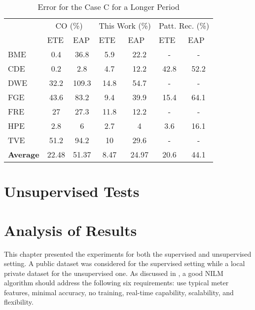 \begin{table}[tb]
\centering
\caption{Error for the Case C for a Longer Period}
\label{results2}
\begin{tabular}{lcccccc}
\hline
    & \multicolumn{2}{c}{CO (\%)}                            & \multicolumn{2}{c}{This Work (\%)}                    & \multicolumn{2}{c}{Patt. Rec. (\%)}                     \\
    & \multicolumn{1}{l}{ETE} & \multicolumn{1}{l}{EAP} & \multicolumn{1}{l}{ETE} & \multicolumn{1}{l}{EAP} & \multicolumn{1}{l}{ETE} & \multicolumn{1}{l}{EAP} \\ \hline
BME & 0.4                   & 36.8                  & 5.9                   & 22.2                  & -                    & -                    \\
CDE & 0.2                   & 2.8                   & 4.7                   & 12.2                  & 42.8                 & 52.2                   \\
DWE & 32.2                  & 109.3                   & 14.8                  & 54.7                  & -                    & -                    \\
FGE & 43.6                  & 83.2                  & 9.4                   & 39.9                  & 15.4                 & 64.1                   \\
FRE & 27                    & 27.3                  & 11.8                  & 12.2                  & -                    & -                       \\
HPE & 2.8                   & 6                   & 2.7                   & 4                   & 3.6                  & 16.1                   \\ 
TVE & 51.2                  & 94.2                  & 10                    & 29.6                  & -                    & -                    \\ \hline
\textbf{Average} & 22.48     & 51.37                  & 8.47                   & 24.97                  & 20.6                 & 44.1                 \\ \hline
\end{tabular}
\end{table}

\section{Unsupervised Tests}

\section{Analysis of Results}
This chapter presented the experiments for both the supervised and unsupervised setting. A public dataset was considered for the supervised setting while a local private dataset for the unsupervised one. As discussed in \cite{zeifman_analysis}, a good NILM algorithm should address the following six requirements: use typical meter features, minimal accuracy, no training, real-time capability, scalability, and flexibility.

